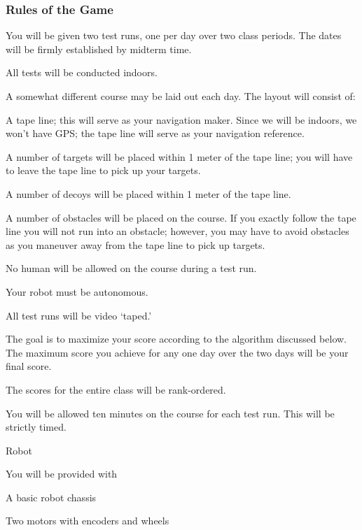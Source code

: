 \subsubsection*{Rules of the Game}


\begin{DoxyItemize}
\item You will be given two test runs, one per day over two class periods. The dates will be firmly established by midterm time.
\item All tests will be conducted indoors.
\item A somewhat different course may be laid out each day. The layout will consist of\+:
\begin{DoxyItemize}
\item A tape line; this will serve as your navigation maker. Since we will be indoors, we won’t have G\+PS; the tape line will serve as your navigation reference.
\item A number of targets will be placed within 1 meter of the tape line; you will have to leave the tape line to pick up your targets.
\item A number of decoys will be placed within 1 meter of the tape line.
\item A number of obstacles will be placed on the course. If you exactly follow the tape line you will not run into an obstacle; however, you may have to avoid obstacles as you maneuver away from the tape line to pick up targets.
\end{DoxyItemize}
\item No human will be allowed on the course during a test run.
\item Your robot must be autonomous.
\item All test runs will be video ‘taped.\+’
\item The goal is to maximize your score according to the algorithm discussed below. The maximum score you achieve for any one day over the two days will be your final score.
\item The scores for the entire class will be rank-\/ordered.
\item You will be allowed ten minutes on the course for each test run. This will be strictly timed.
\item Robot
\begin{DoxyItemize}
\item You will be provided with
\begin{DoxyItemize}
\item A basic robot chassis
\item Two motors with encoders and wheels

\end{DoxyItemize}
\end{DoxyItemize}
\end{DoxyItemize}
